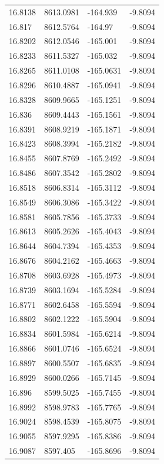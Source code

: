 \begin{table}[H]
\begin{tabular}{llll}
16.8138 & 8613.0981 & -164.939 & -9.8094 \\
16.817 & 8612.5764 & -164.97 & -9.8094 \\
16.8202 & 8612.0546 & -165.001 & -9.8094 \\
16.8233 & 8611.5327 & -165.032 & -9.8094 \\
16.8265 & 8611.0108 & -165.0631 & -9.8094 \\
16.8296 & 8610.4887 & -165.0941 & -9.8094 \\
16.8328 & 8609.9665 & -165.1251 & -9.8094 \\
16.836 & 8609.4443 & -165.1561 & -9.8094 \\
16.8391 & 8608.9219 & -165.1871 & -9.8094 \\
16.8423 & 8608.3994 & -165.2182 & -9.8094 \\
16.8455 & 8607.8769 & -165.2492 & -9.8094 \\
16.8486 & 8607.3542 & -165.2802 & -9.8094 \\
16.8518 & 8606.8314 & -165.3112 & -9.8094 \\
16.8549 & 8606.3086 & -165.3422 & -9.8094 \\
16.8581 & 8605.7856 & -165.3733 & -9.8094 \\
16.8613 & 8605.2626 & -165.4043 & -9.8094 \\
16.8644 & 8604.7394 & -165.4353 & -9.8094 \\
16.8676 & 8604.2162 & -165.4663 & -9.8094 \\
16.8708 & 8603.6928 & -165.4973 & -9.8094 \\
16.8739 & 8603.1694 & -165.5284 & -9.8094 \\
16.8771 & 8602.6458 & -165.5594 & -9.8094 \\
16.8802 & 8602.1222 & -165.5904 & -9.8094 \\
16.8834 & 8601.5984 & -165.6214 & -9.8094 \\
16.8866 & 8601.0746 & -165.6524 & -9.8094 \\
16.8897 & 8600.5507 & -165.6835 & -9.8094 \\
16.8929 & 8600.0266 & -165.7145 & -9.8094 \\
16.896 & 8599.5025 & -165.7455 & -9.8094 \\
16.8992 & 8598.9783 & -165.7765 & -9.8094 \\
16.9024 & 8598.4539 & -165.8075 & -9.8094 \\
16.9055 & 8597.9295 & -165.8386 & -9.8094 \\
16.9087 & 8597.405 & -165.8696 & -9.8094 \\

\end{tabular}
\end{table}
